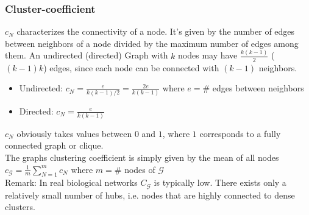 \subsubsection{Cluster-coefficient}
$c_N$ characterizes the connectivity of a node. It's given by the number of edges between neighbors of a node divided by the maximum number of edges among them. An undirected (directed) Graph with $k$ nodes may have $\frac{k(k-1)}{2}$ ($(k-1)k$) edges, since each node can be connected with $(k-1)$ neighbors.\\
\begin{itemize}[label={}]
\item Undirected: $c_N=\frac{e}{k(k-1)/2}=\frac{2e}{k(k-1)}$ where $e=\#$ edges between neighbors
\item Directed: $c_N=\frac{e}{k(k-1)}$
\end{itemize}
$c_N$ obviously takes values between $0$ and $1$, where $1$ corresponds to a fully connected graph or clique.\\
The graphs clustering coefficient is simply given by the mean of all nodes $c_\mathcal{G}=\frac{1}{m}\sum\limits_{N=1}^m c_N$ where $m=\#$ nodes of $\mathcal{G}$\\
Remark: In real biological networks $C_\mathcal{G}$ is typically low. There exists only a relatively small number of hubs, i.e. nodes that are highly connected to dense clusters.\\
